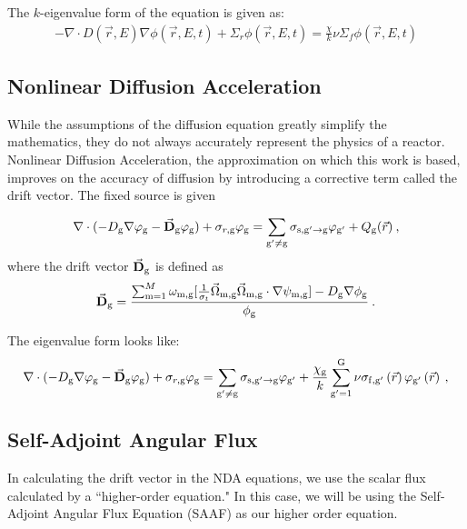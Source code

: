 The $k$-eigenvalue form of the equation is given as:
\begin{equation}
    \begin{split}
         - \nabla \cdot D(\vec{r}, E)\nabla\phi(\vec{r}, E, t) + \Sigma_r \phi(\vec{r}, E, t) =  \frac{\chi}{k}\nu\Sigma_f\phi(\vec{r}, E, t) 
    \end{split}
    \label{eq:diffusion_eigenvalue}
\end{equation}

\subsection{Nonlinear Diffusion Acceleration}
While the assumptions of the diffusion equation greatly simplify the mathematics, they do not always accurately represent the physics of a reactor. Nonlinear Diffusion Acceleration, the approximation on which this work is based, improves on the accuracy of diffusion by introducing a corrective term called the drift vector. The fixed source is given 

\begin{equation}
  \nabla\cdot(-D_{\mathrm{g}} \nabla \varphi_{\mathrm{g}} - \vec{\bf D}_{\mathrm{g}} \varphi_{\mathrm{g}}) + \sigma_{r,\mathrm{g}} \varphi_{\mathrm{g}} = \sum\limits_{{\mathrm{g}'}\neq\mathrm{g}}\sigma_{\mathrm{s},\mathrm{g}' \rightarrow \mathrm{g}}\varphi_{\mathrm{g}'} + Q_{\mathrm{g}}(\vec{r}) \:, \label{eq:NDA_fixed_source}
  \end{equation}
  where the drift vector $\vec{\bf D}_{\mathrm{g}}$ is defined as
  \begin{equation}
  \vec{\bf D}_{\mathrm{g}}= \frac{\sum_{\mathrm{m}=1}^M \omega_{\mathrm{m}, \mathrm{g}} [\frac{1}{\sigma_t} \vec{\Omega}_{\mathrm{m}, \mathrm{g}} \vec{\Omega}_{\mathrm{m}, \mathrm{g}} \cdot \nabla\psi_{\mathrm{m}, \mathrm{g}}] - D_{\mathrm{g}} \nabla \phi_{\mathrm{g}}}{\phi_{\mathrm{g}}}\:. \label{eq:drift_vector}
  \end{equation}
 
 The eigenvalue form looks like:
 \begin{equation}
  \nabla\cdot(-D_{\mathrm{g}} \nabla \varphi_{\mathrm{g}} - \vec{\bf D}_{\mathrm{g}} \varphi_{\mathrm{g}}) + \sigma_{r,\mathrm{g}} \varphi_{\mathrm{g}} = \sum\limits_{{\mathrm{g}'}\neq\mathrm{g}}\sigma_{\mathrm{s},\mathrm{g}' \rightarrow \mathrm{g}}\varphi_{\mathrm{g}'} +  \frac{\chi_{\mathrm{g}}}{k} \sum\limits_{\mathrm{g}'=1}^{\mathrm{G}} \nu \sigma_{\mathrm{f},\mathrm{g}'}\left(\vec{r}\right) \varphi_{\mathrm{g}'}\left(\vec{r}\right) \:, \label{eq:NDA_eigenvalue}
  \end{equation}

\subsection{Self-Adjoint Angular Flux}
In calculating the drift vector in the NDA equations, we use the scalar flux calculated by a ``higher-order equation." In this case, we will be using the Self-Adjoint Angular Flux Equation (SAAF) \cite{saaf} as our higher order equation. 

